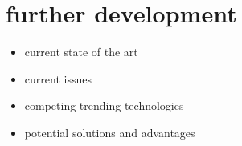 \documentclass[t, aspectratio=169]{beamer}
\begin{document}
\section{further development}
\begin{frame}[c]
	\centering\LARGE\textbf{\secname}
\end{frame}


\begin{frame}{\secname}
	\begin{itemize}
		\item current state of the art
		\item current issues
		\item competing trending technologies
		\item potential solutions and advantages
	\end{itemize}
	\vspace{1 cm}
\end{frame}
\end{document}
